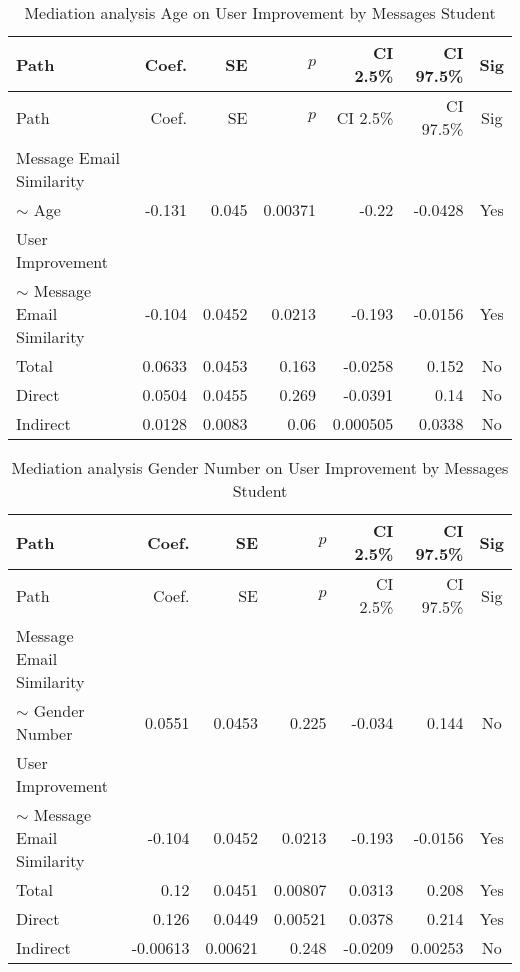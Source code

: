 \begin{longtable}{lrrrrrc}
            \caption{Mediation analysis Age on User Improvement by  Messages Student}\label{tab:mediation Age on User Improvement by  Messages Student}\\
            \toprule
            Path & Coef. & SE & $p$ & CI 2.5\% & CI 97.5\% & Sig \\
            \midrule
            \endfirsthead
            \toprule
            Path & Coef. & SE & $p$ & CI 2.5\% & CI 97.5\% & Sig \\
            \midrule
            \endhead
            \bottomrule
            \endfoot
            Message Email Similarity\\ $\sim$ Age & -0.131 & 0.045 & 0.00371 & -0.22 & -0.0428 & Yes \\
User Improvement\\ $\sim$ Message Email Similarity & -0.104 & 0.0452 & 0.0213 & -0.193 & -0.0156 & Yes \\
Total & 0.0633 & 0.0453 & 0.163 & -0.0258 & 0.152 & No \\
Direct & 0.0504 & 0.0455 & 0.269 & -0.0391 & 0.14 & No \\
Indirect & 0.0128 & 0.0083 & 0.06 & 0.000505 & 0.0338 & No \\
\end{longtable}

\begin{longtable}{lrrrrrc}
            \caption{Mediation analysis Gender Number on User Improvement by  Messages Student}\label{tab:mediation Gender Number on User Improvement by  Messages Student}\\
            \toprule
            Path & Coef. & SE & $p$ & CI 2.5\% & CI 97.5\% & Sig \\
            \midrule
            \endfirsthead
            \toprule
            Path & Coef. & SE & $p$ & CI 2.5\% & CI 97.5\% & Sig \\
            \midrule
            \endhead
            \bottomrule
            \endfoot
            Message Email Similarity\\ $\sim$ Gender Number & 0.0551 & 0.0453 & 0.225 & -0.034 & 0.144 & No \\
User Improvement\\ $\sim$ Message Email Similarity & -0.104 & 0.0452 & 0.0213 & -0.193 & -0.0156 & Yes \\
Total & 0.12 & 0.0451 & 0.00807 & 0.0313 & 0.208 & Yes \\
Direct & 0.126 & 0.0449 & 0.00521 & 0.0378 & 0.214 & Yes \\
Indirect & -0.00613 & 0.00621 & 0.248 & -0.0209 & 0.00253 & No \\
\end{longtable}

